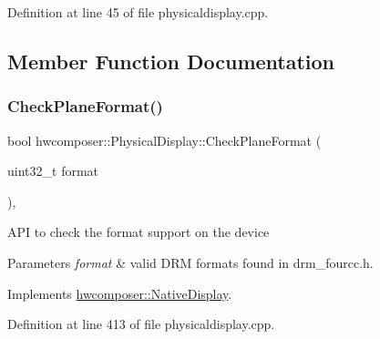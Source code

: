 Definition at line 45 of file physicaldisplay.\+cpp.


\begin{DoxyCode}{0}
\end{DoxyCode}


\subsection{Member Function Documentation}
\mbox{\label{classhwcomposer_1_1PhysicalDisplay_ad4986df79c02c4c30e205065028cc050}} 
\subsubsection{\texorpdfstring{Check\+Plane\+Format()}{CheckPlaneFormat()}}
{\footnotesize\ttfamily bool hwcomposer\+::\+Physical\+Display\+::\+Check\+Plane\+Format (\begin{DoxyParamCaption}\item[{uint32\+\_\+t}]{format }\end{DoxyParamCaption})\hspace{0.3cm}{\ttfamily [override]}, {\ttfamily [virtual]}}

A\+PI to check the format support on the device 
\begin{DoxyParams}{Parameters}
{\em format} & valid D\+RM formats found in drm\+\_\+fourcc.\+h. \\
\hline
\end{DoxyParams}


Implements \mbox{\hyperlink{classhwcomposer_1_1NativeDisplay_a4e856b5754054bdf77467e6663cb5b50}{hwcomposer\+::\+Native\+Display}}.



Definition at line 413 of file physicaldisplay.\+cpp.


\begin{DoxyCode}{0}
\end{DoxyCode}
\mbox{\label{classhwcomposer_1_1PhysicalDisplay_aca407c116394ab91581293e8a919cf78}} 
